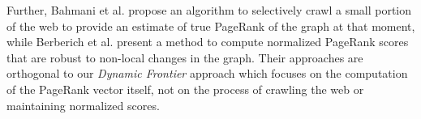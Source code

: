 
Further, Bahmani et al. \cite{rank-bahmani12} propose an algorithm to selectively crawl a small portion of the web to provide an estimate of true PageRank of the graph at that moment, while Berberich et al. \cite{rank-berberich07} present a method to compute normalized PageRank scores that are robust to non-local changes in the graph. Their approaches are orthogonal to our \textit{Dynamic Frontier} approach which focuses on the computation of the PageRank vector itself, not on the process of crawling the web or maintaining normalized scores.





